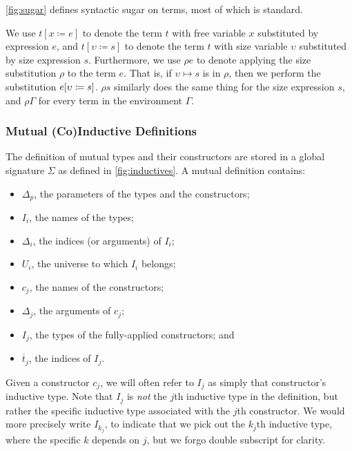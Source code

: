 

\autoref{fig:sugar} defines syntactic sugar on terms, most of which is standard.

We use $t[x \coloneqq e]$ to denote the term $t$ with free variable $x$ substituted by expression $e$,
and $t[\upsilon \coloneqq s]$ to denote the term $t$ with size variable $\upsilon$ substituted by size expression $s$.
Furthermore, we use $\rho e$ to denote applying the size substitution $\rho$ to the term $e$.
That is, if $\upsilon \mapsto s$ is in $\rho$, then we perform the substitution $e [\upsilon \coloneqq s]$.
$\rho s$ similarly does the same thing for the size expression $s$, and $\rho \Gamma$ for every term in the environment $\Gamma$.

\subsubsection{Mutual (Co)Inductive Definitions}



The definition of mutual \coinductive types and their constructors are stored in a global signature $\Sigma$ as defined in \autoref{fig:inductives}.
A mutual \coinductive definition contains:

\begin{itemize}
    \item $\Delta_p$, the parameters of the \coinductive types and the constructors;
    \item $I_i$, the names of the \coinductive types;
    \item $\Delta_i$, the indices (or arguments) of $I_i$;
    \item $U_i$, the universe to which $I_i$ belongs;
    \item $c_j$, the names of the constructors;
    \item $\Delta_j$, the arguments of $c_j$;
    \item $I_j$, the \coinductive types of the fully-applied constructors; and
    \item $\overline{t}_j$, the indices of $I_j$.
\end{itemize}

Given a constructor $c_j$, we will often refer to $I_j$ as simply that constructor's inductive type.
Note that $I_j$ is \textit{not} the $j$th inductive type in the definition, but rather the specific inductive type associated with the $j$th constructor.
We would more precisely write $I_{k_j}$, to indicate that we pick out the $k_j$th inductive type, where the specific $k$ depends on $j$, but we forgo double subscript for clarity.

